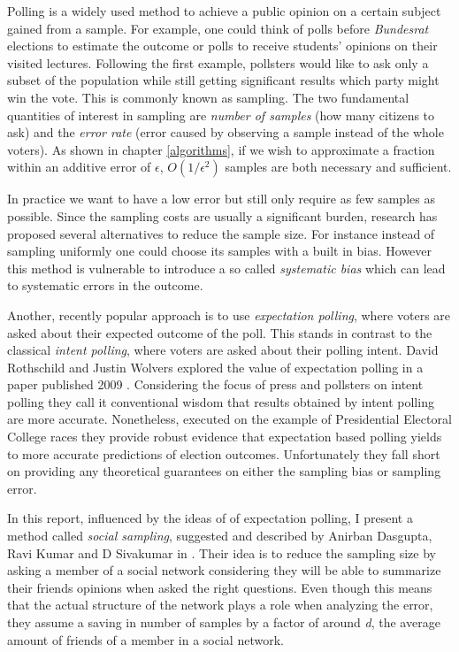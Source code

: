 Polling is a widely used method to achieve a public opinion on a certain subject gained from a sample. For example, one could think of polls before \textit{Bundesrat} elections to estimate the outcome or polls to receive students' opinions on their visited lectures.
Following the first example, pollsters would like to ask only a subset of the population while still getting significant results which party might win the vote. This is commonly known as sampling.
The two fundamental quantities of interest in sampling are \textit{number of samples} (how many citizens to ask) and the \textit{error rate} (error caused by observing a sample instead of the whole voters). As shown in chapter \ref{algorithms}, if we wish to approximate a fraction within an additive error of $\epsilon$, $O(1/\epsilon^{2})$ samples are both necessary and sufficient.

In practice we want to have a low error but still only require as few samples as possible.
Since the sampling costs are usually a significant burden, research has proposed several alternatives to reduce the sample size.
For instance instead of sampling uniformly one could choose its samples with a built in bias.
However this method is vulnerable to introduce a so called \textit{systematic bias} which can lead to systematic errors in the outcome.

Another, recently popular approach is to use \textit{expectation polling}, where voters are asked about their expected outcome of the poll. This stands in contrast to the classical \textit{intent polling}, where voters are asked about their polling intent. David Rothschild and Justin Wolvers explored the value of expectation polling in a paper published 2009 \cite{rothschild2009forecasting}. Considering the focus of press and pollsters on intent polling they call it conventional wisdom that results obtained by intent polling are more accurate. Nonetheless, executed on the example of Presidential Electoral College races they provide robust evidence that expectation based polling yields to more accurate predictions of election outcomes.
Unfortunately they fall short on providing any theoretical guarantees on either the sampling bias or sampling error.

In this report, influenced by the ideas of of expectation polling, I present a method called \textit{social sampling}, suggested and described by Anirban Dasgupta, Ravi Kumar and D Sivakumar in \cite{dasgupta2012social}.
Their idea is to reduce the sampling size by asking a member of a social network considering they will be able to summarize their friends opinions when asked the right questions.
Even though this means that the actual structure of the network plays a role when analyzing the error, they assume a saving in number of samples by a factor of around \textit{d}, the average amount of friends of a member in a social network.

